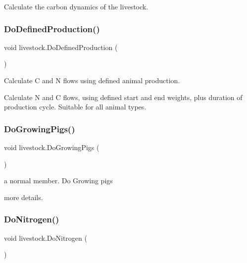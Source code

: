 Calculate the carbon dynamics of the livestock. 

\mbox{\label{classlivestock_ac40dff6a0a45d6a86ed5348166bd9074}} 
\subsubsection{\texorpdfstring{DoDefinedProduction()}{DoDefinedProduction()}}
{\footnotesize\ttfamily void livestock.\+Do\+Defined\+Production (\begin{DoxyParamCaption}{ }\end{DoxyParamCaption})\hspace{0.3cm}{\ttfamily [inline]}}



Calculate C and N flows using defined animal production. 

Calculate N and C flows, using defined start and end weights, plus duration of production cycle. Suitable for all animal types. \mbox{\label{classlivestock_aeff04ec4200c0e18934cf3d0084fb187}} 
\subsubsection{\texorpdfstring{DoGrowingPigs()}{DoGrowingPigs()}}
{\footnotesize\ttfamily void livestock.\+Do\+Growing\+Pigs (\begin{DoxyParamCaption}{ }\end{DoxyParamCaption})\hspace{0.3cm}{\ttfamily [inline]}}



a normal member. Do Growing pigs 

more details. \mbox{\label{classlivestock_ac4347842c79f5017c56d3d1dd2ab4d53}} 
\subsubsection{\texorpdfstring{DoNitrogen()}{DoNitrogen()}}
{\footnotesize\ttfamily void livestock.\+Do\+Nitrogen (\begin{DoxyParamCaption}{ }\end{DoxyParamCaption})\hspace{0.3cm}{\ttfamily [inline]}}



